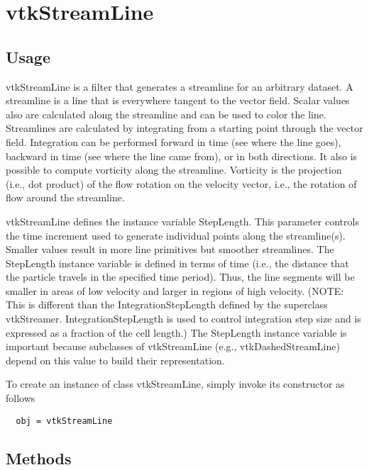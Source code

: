 \section{vtkStreamLine}

\subsection{Usage}

 vtkStreamLine is a filter that generates a streamline for an arbitrary 
 dataset. A streamline is a line that is everywhere tangent to the vector
 field. Scalar values also are calculated along the streamline and can be 
 used to color the line. Streamlines are calculated by integrating from
 a starting point through the vector field. Integration can be performed
 forward in time (see where the line goes), backward in time (see where the
 line came from), or in both directions. It also is possible to compute
 vorticity along the streamline. Vorticity is the projection (i.e., dot
 product) of the flow rotation on the velocity vector, i.e., the rotation
 of flow around the streamline.

 vtkStreamLine defines the instance variable StepLength. This parameter 
 controls the time increment used to generate individual points along
 the streamline(s). Smaller values result in more line 
 primitives but smoother streamlines. The StepLength instance variable is 
 defined in terms of time (i.e., the distance that the particle travels in
 the specified time period). Thus, the line segments will be smaller in areas
 of low velocity and larger in regions of high velocity. (NOTE: This is
 different than the IntegrationStepLength defined by the superclass
 vtkStreamer. IntegrationStepLength is used to control integration step 
 size and is expressed as a fraction of the cell length.) The StepLength
 instance variable is important because subclasses of vtkStreamLine (e.g.,
 vtkDashedStreamLine) depend on this value to build their representation.

To create an instance of class vtkStreamLine, simply
invoke its constructor as follows
\begin{verbatim}
  obj = vtkStreamLine
\end{verbatim}
\subsection{Methods}

